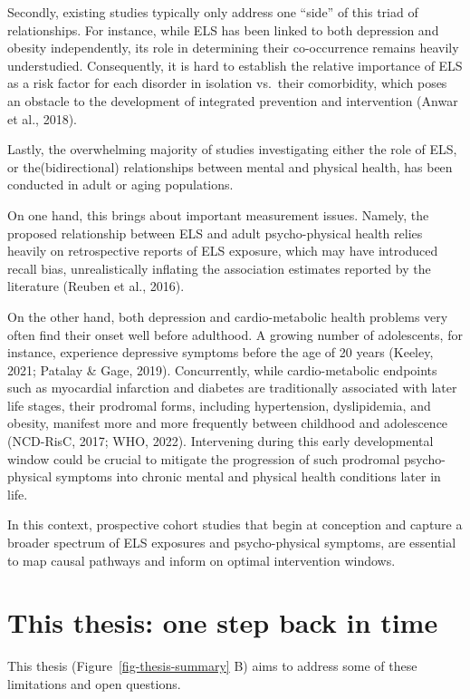 \documentclass[
  letterpaper,
  DIV=11,
  numbers=noendperiod]{scrreport}
\begin{document}
Secondly, existing studies typically only address one ``side'' of this
triad of relationships. For instance, while ELS has been linked to both
depression and obesity independently, its role in determining their
co-occurrence remains heavily understudied. Consequently, it is hard to
establish the relative importance of ELS as a risk factor for each
disorder in isolation vs.~their comorbidity, which poses an obstacle to
the development of integrated prevention and intervention (Anwar et al.,
2018).

Lastly, the overwhelming majority of studies investigating either the
role of ELS, or the(bidirectional) relationships between mental and
physical health, has been conducted in adult or aging populations.

On one hand, this brings about important measurement issues. Namely, the
proposed relationship between ELS and adult psycho-physical health
relies heavily on retrospective reports of ELS exposure, which may have
introduced recall bias, unrealistically inflating the association
estimates reported by the literature (Reuben et al., 2016).

On the other hand, both depression and cardio-metabolic health problems
very often find their onset well before adulthood. A growing number of
adolescents, for instance, experience depressive symptoms before the age
of 20 years (Keeley, 2021; Patalay \& Gage, 2019). Concurrently, while
cardio-metabolic endpoints such as myocardial infarction and diabetes
are traditionally associated with later life stages, their prodromal
forms, including hypertension, dyslipidemia, and obesity, manifest more
and more frequently between childhood and adolescence (NCD-RisC, 2017;
WHO, 2022). Intervening during this early developmental window could be
crucial to mitigate the progression of such prodromal psycho-physical
symptoms into chronic mental and physical health conditions later in
life.

In this context, prospective cohort studies that begin at conception and
capture a broader spectrum of ELS exposures and psycho-physical
symptoms, are essential to map causal pathways and inform on optimal
intervention windows.

\section{This thesis: one step back in
time}\label{this-thesis-one-step-back-in-time}

This thesis (Figure~\ref{fig-thesis-summary} B) aims to address some of
these limitations and open questions.
\end{document}

